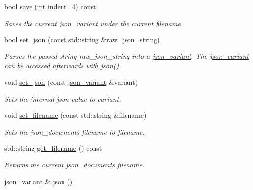 \begin{DoxyCompactItemize}
bool \hyperlink{classJSONLIB__NAMESPACE_1_1json__document_a861865e1aae02c2de80eb60a4a8bd668}{save} (int indent=4) const
\begin{DoxyCompactList}\small\item\em Saves the current \hyperlink{classJSONLIB__NAMESPACE_1_1json__variant}{json\+\_\+variant} under the current filename. \end{DoxyCompactList}\item 
bool \hyperlink{classJSONLIB__NAMESPACE_1_1json__document_a5a72e4dc0b37b95c70baefad930b5b71}{set\+\_\+json} (const std\+::string \&raw\+\_\+json\+\_\+string)
\begin{DoxyCompactList}\small\item\em Parses the passed string {\ttfamily raw\+\_\+json\+\_\+string} into a \hyperlink{classJSONLIB__NAMESPACE_1_1json__variant}{json\+\_\+variant}. The \hyperlink{classJSONLIB__NAMESPACE_1_1json__variant}{json\+\_\+variant} can be accessed afterwards with \hyperlink{classJSONLIB__NAMESPACE_1_1json__document_ad87b8e7d68ba854dbd730758273a3b93}{json()}. \end{DoxyCompactList}\item 
void \hyperlink{classJSONLIB__NAMESPACE_1_1json__document_ae6c52de0f1b1b6e5825f9555b6026e1b}{set\+\_\+json} (const \hyperlink{classJSONLIB__NAMESPACE_1_1json__variant}{json\+\_\+variant} \&variant)
\begin{DoxyCompactList}\small\item\em Sets the internal json value to {\ttfamily variant}. \end{DoxyCompactList}\item 
void \hyperlink{classJSONLIB__NAMESPACE_1_1json__document_acc406344661e361c75ac7bc307057712}{set\+\_\+filename} (const std\+::string \&filename)
\begin{DoxyCompactList}\small\item\em Sets the json\+\_\+documents {\itshape filename} to {\ttfamily filename}. \end{DoxyCompactList}\item 
std\+::string \hyperlink{classJSONLIB__NAMESPACE_1_1json__document_a6f362476926f33fb8c3437d15052e959}{get\+\_\+filename} () const
\begin{DoxyCompactList}\small\item\em Returns the current json\+\_\+documents {\itshape filename}. \end{DoxyCompactList}\item 
\hyperlink{classJSONLIB__NAMESPACE_1_1json__variant}{json\+\_\+variant} \& \hyperlink{classJSONLIB__NAMESPACE_1_1json__document_a8e43f6245c1ea943aba53f4341190291}{json} ()

\end{DoxyCompactItemize}
